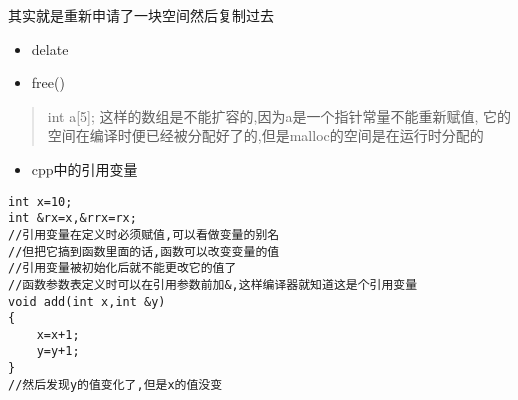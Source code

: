 \documentclass[11pt]{article}
\begin{document}
其实就是重新申请了一块空间然后复制过去
\begin{itemize}
\item delate
\item free()
\end{itemize}
\begin{quote}
int a[5];
这样的数组是不能扩容的,因为a是一个指针常量不能重新赋值,
它的空间在编译时便已经被分配好了的,但是malloc的空间是在运行时分配的
\end{quote}

\begin{itemize}
\item cpp中的引用变量
\end{itemize}
\begin{verbatim}
int x=10;
int &rx=x,&rrx=rx;
//引用变量在定义时必须赋值,可以看做变量的别名
//但把它搞到函数里面的话,函数可以改变变量的值
//引用变量被初始化后就不能更改它的值了
//函数参数表定义时可以在引用参数前加&,这样编译器就知道这是个引用变量
void add(int x,int &y)
{
    x=x+1;
    y=y+1;
}
//然后发现y的值变化了,但是x的值没变
\end{verbatim}
\end{document}
